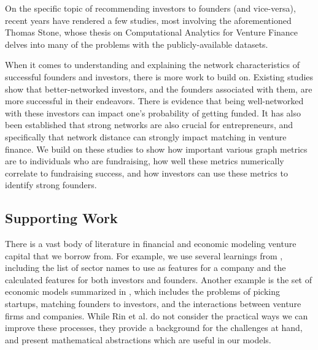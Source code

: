 On the specific topic of recommending investors to founders (and vice-versa), recent years have rendered a few studies, most involving the aforementioned Thomas Stone, whose thesis on Computational Analytics for Venture Finance~\cite{stone2014computational} delves into many of the problems with the publicly-available datasets.

When it comes to understanding and explaining the network characteristics of successful founders and investors, there is more work to build on. Existing studies show that better-networked investors, and the founders associated with them, are more successful in their endeavors\cite{doi:10.1111/j.1540-6261.2007.01207.x}. There is evidence that being well-networked with these investors can impact one's probability of getting funded\cite{doi:10.1287/mnsc.48.3.364.7731}. It has also been established that strong networks are also crucial for entrepreneurs\cite{BIRLEY1985107}, and specifically that network distance can strongly impact matching\cite{pasquini2017matching} in venture finance. We build on these studies to show how important various graph metrics are to individuals who are fundraising, how well these metrics numerically correlate to fundraising success, and how investors can use these metrics to identify strong founders.

\subsection{Supporting Work}

There is a vast body of literature in financial and economic modeling venture capital that we borrow from. For example, we use several learnings from \cite{2017arXiv170604229H}, including the list of sector names to use as features for a company and the calculated features for both investors and founders. Another example is the set of economic models summarized in \cite{venture-survey}, which includes the problems of picking startups, matching founders to investors, and the interactions between venture firms and companies. While Rin et al. do not consider the practical ways we can improve these processes, they provide a background for the challenges at hand, and present mathematical abstractions which are useful in our models.
